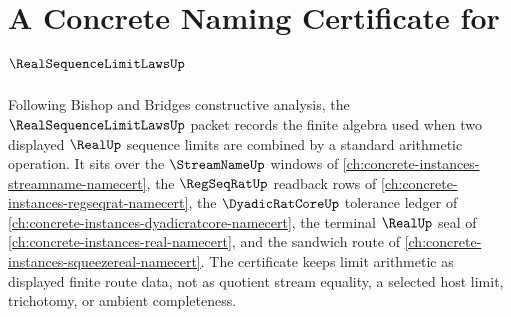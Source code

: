 \chapter{A Concrete Naming Certificate for $\RealSequenceLimitLawsUp$}
\label{ch:concrete-instances-real-sequence-limit-laws-namecert}

Following Bishop and Bridges constructive analysis, the
$\RealSequenceLimitLawsUp$ packet records the finite algebra used when two
displayed $\RealUp$ sequence limits are combined by a standard arithmetic
operation. It sits over the $\StreamNameUp$ windows of
\autoref{ch:concrete-instances-streamname-namecert}, the $\RegSeqRatUp$
readback rows of \autoref{ch:concrete-instances-regseqrat-namecert}, the
$\DyadicRatCoreUp$ tolerance ledger of
\autoref{ch:concrete-instances-dyadicratcore-namecert}, the terminal
$\RealUp$ seal of \autoref{ch:concrete-instances-real-namecert}, and the
sandwich route of \autoref{ch:concrete-instances-squeezereal-namecert}. The
certificate keeps limit arithmetic as displayed finite route data, not as
quotient stream equality, a selected host limit, trichotomy, or ambient
completeness.

